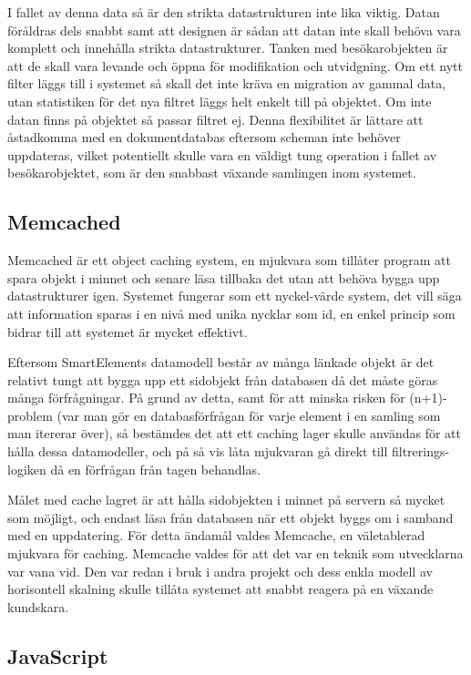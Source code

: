 I fallet av denna data så är den strikta datastrukturen inte lika viktig. Datan föråldras dels snabbt samt att designen är sådan att datan inte skall behöva vara komplett och innehålla strikta datastrukturer. Tanken med besökarobjekten är att de skall vara levande och öppna för modifikation och utvidgning. Om ett nytt filter läggs till i systemet så skall det inte kräva en migration av gammal data, utan statistiken för det nya filtret läggs helt enkelt till på objektet. Om inte datan finns på objektet så passar filtret ej. Denna flexibilitet är lättare att åstadkomma med en dokumentdatabas eftersom scheman inte behöver uppdateras, vilket potentiellt skulle vara en väldigt tung operation i fallet av besökarobjektet, som är den snabbast växande samlingen inom systemet.

\subsection{Memcached}

Memcached är ett object caching system, en mjukvara som tillåter program att spara objekt i minnet och senare läsa tillbaka det utan att behöva bygga upp datastrukturer igen. Systemet fungerar som ett nyckel-värde system, det vill säga att information sparas i en nivå med unika nycklar som id, en enkel princip som bidrar till att systemet är mycket effektivt. \citep{memcachedwiki}

Eftersom SmartElements datamodell består av många länkade objekt är det relativt tungt att bygga upp ett sidobjekt från databasen då det måste göras många förfrågningar. På grund av detta, samt för att minska risken för (n+1)-problem (var man gör en databasförfrågan för varje element i en samling som man itererar över), så bestämdes det att ett caching lager skulle användas för att hålla dessa datamodeller, och på så vis låta mjukvaran gå direkt till filtrerings-logiken då en förfrågan från tagen behandlas.

Målet med cache lagret är att hålla sidobjekten i minnet på servern så mycket som möjligt, och endast läsa från databasen när ett objekt byggs om i samband med en uppdatering. För detta ändamål valdes Memcache, en väletablerad mjukvara för caching. Memcache valdes för att det var en teknik som utvecklarna var vana vid. Den var redan i bruk i andra projekt och dess enkla modell av horisontell skalning skulle tillåta systemet att snabbt reagera på en växande kundskara.

\subsection{JavaScript}

